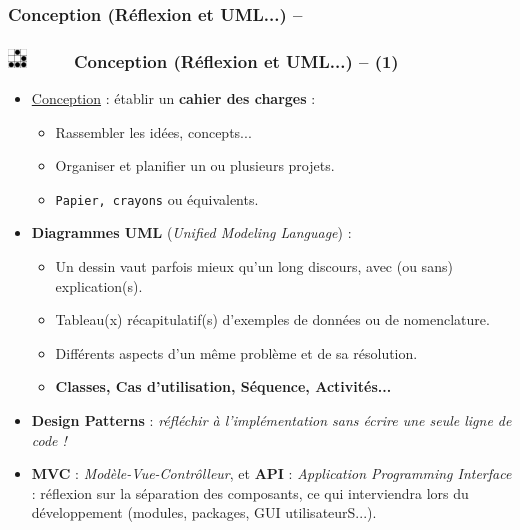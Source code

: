 \documentclass[slidetop,11pt]{beamer}
\def\sectionPartIaUN{Conception (R{\'e}flexion et UML...) -- }
\def\moreInFrameTitle{\includegraphics[height=0.5cm]{img/logo_glider.png}~~~~~}
\begin{document}
\subsubsection{\sectionPartIaUN}
\begin{frame}
	\frametitle{\moreInFrameTitle \sectionPartIaUN (1)}
	\begin{itemize}
		\item \underline{Conception} : {\'e}tablir un \textbf{cahier des charges} : 
			\begin{itemize}
				\item Rassembler les id{\'e}es, concepts...
				\item Organiser et planifier un ou plusieurs projets. 
				\item \texttt{Papier, crayons} ou {\'e}quivalents. 
			\end{itemize}
		\item \textbf{Diagrammes UML} (\emph{Unified Modeling Language}) : 
			\begin{itemize}
				\item Un dessin vaut parfois mieux qu'un long discours, avec (ou sans) explication(s). 
				\item Tableau(x) r{\'e}capitulatif(s) d'exemples de donn{\'e}es ou de nomenclature. 
				\item Diff{\'e}rents aspects d'un m{\^e}me probl{\`e}me et de sa r{\'e}solution. 
				\item \textbf{Classes, Cas d'utilisation, S{\'e}quence, Activit{\'e}s...}
			\end{itemize}
		\item \textbf{Design Patterns} : \emph{r{\'e}fl{\'e}chir {\`a} l'impl{\'e}mentation sans {\'e}crire une seule ligne de code !}
		\item \textbf{MVC} : \emph{Mod{\`e}le-Vue-Contr{\^o}lleur}, et \textbf{API} : \emph{Application Programming Interface} : r{\'e}flexion sur la s{\'e}paration des composants, ce qui interviendra lors du d{\'e}veloppement (modules, packages, GUI utilisateurS...). 
	\end{itemize}
\end{frame} 
\end{document}
